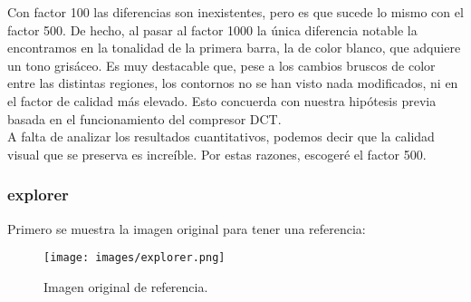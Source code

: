 \documentclass[12pt,a4paper]{article}
\begin{document}
Con factor 100 las diferencias son inexistentes, pero es que sucede lo mismo con el factor 500. De hecho, al pasar al factor 1000 la única diferencia notable la encontramos en la tonalidad de la primera barra, la de color blanco, que adquiere un tono grisáceo. Es muy destacable que, pese a los cambios bruscos de color entre las distintas regiones, los contornos no se han visto nada modificados, ni en el factor de calidad más elevado. Esto concuerda con nuestra hipótesis previa basada en el funcionamiento del compresor DCT.\\

A falta de analizar los resultados cuantitativos, podemos decir que la calidad visual que se preserva es increíble. Por estas razones, escogeré el factor 500.\\

\subsubsection{explorer}
Primero se muestra la imagen original para tener una referencia:
\begin{figure}[H]
    \centering
    \texttt{[image: images/explorer.png]}
    \caption[Referencia - explorer]{Imagen original de referencia.}
    
\end{figure}
    
    \vspace{0.5cm}
\end{document}
